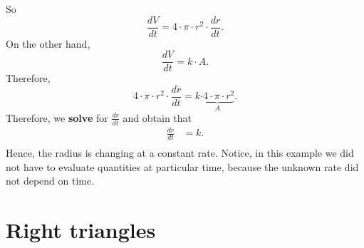 \documentclass{ximera}
\begin{document}
\begin{example}
\begin{explanation}
   So
  \[
  \frac{dV}{dt} = 4\cdot \pi\cdot r^2 \cdot \frac{dr}{dt}.
  \]
 On the other hand,
   \[
 \frac{dV}{dt} = k\cdot A.
  \]
  Therefore, 
  \[
 4\cdot \pi \cdot r^2 \cdot \frac{dr}{dt} =  k\underbrace{\cdot 4\cdot
  \pi \cdot r^2}_{A} .
  \]
 Therefore, we \textbf{solve} for $\frac{dr}{dt}$ and obtain that
  \begin{align*}
\frac{dr}{dt} &=  k.\\
  \end{align*}
  Hence, the radius is changing at a constant rate. Notice, in this example we did not have to evaluate quantities at particular time,  because the unknown rate did not depend on time.
\end{explanation}
\end{example}

\section{Right triangles}
\end{document}
